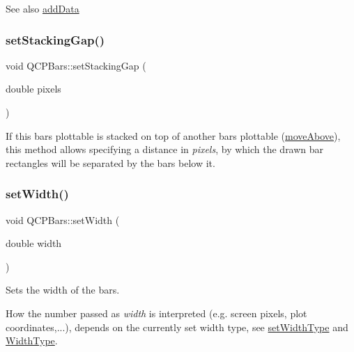 \begin{DoxySeeAlso}{See also}
\mbox{\hyperlink{class_q_c_p_bars_a323d6970d6d6e3166d89916a7f60f733}{add\+Data}} 
\end{DoxySeeAlso}
\mbox{\label{class_q_c_p_bars_aeacf7561afb1c70284b22822b57c7bb5}} 
\subsubsection{\texorpdfstring{set\+Stacking\+Gap()}{setStackingGap()}}
{\footnotesize\ttfamily void Q\+C\+P\+Bars\+::set\+Stacking\+Gap (\begin{DoxyParamCaption}\item[{double}]{pixels }\end{DoxyParamCaption})}

If this bars plottable is stacked on top of another bars plottable (\mbox{\hyperlink{class_q_c_p_bars_ac22e00a6a41509538c21b04f0a57318c}{move\+Above}}), this method allows specifying a distance in {\itshape pixels}, by which the drawn bar rectangles will be separated by the bars below it. \mbox{\label{class_q_c_p_bars_afec6116579d44d5b706e0fa5e5332507}} 
\subsubsection{\texorpdfstring{set\+Width()}{setWidth()}}
{\footnotesize\ttfamily void Q\+C\+P\+Bars\+::set\+Width (\begin{DoxyParamCaption}\item[{double}]{width }\end{DoxyParamCaption})}

Sets the width of the bars.

How the number passed as {\itshape width} is interpreted (e.\+g. screen pixels, plot coordinates,...), depends on the currently set width type, see \mbox{\hyperlink{class_q_c_p_bars_adcaa3b41281bb2c0f7949b341592fcc0}{set\+Width\+Type}} and \mbox{\hyperlink{class_q_c_p_bars_a65dbbf1ab41cbe993d71521096ed4649}{Width\+Type}}. \mbox{\label{class_q_c_p_bars_adcaa3b41281bb2c0f7949b341592fcc0}} 
